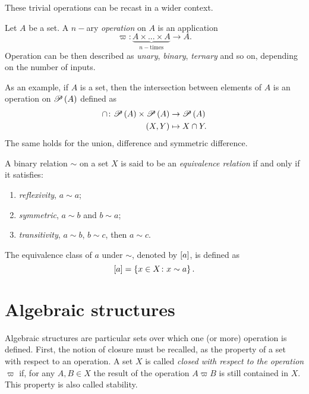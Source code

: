 These trivial operations can be recast in a wider context. 
\begin{definition}[Operation]
    Let $A$ be a set. A $n-$ary \emph{operation} on $A$ is an application
    \begin{equation*}
        \varpi\colon \underbrace{A\times ... \times A}_{n-\text{times}} \rightarrow A.
    \end{equation*}
    Operation can be then described as \textit{unary}, \textit{binary}, \textit{ternary} and so on, depending on the number of inputs.
\end{definition}
As an example, if $A$ is a set, then the intersection between elements of $A$ is an operation on $\mathscr{P}\left( A \right)$ defined as 
\begin{align*}
    \cap\colon\mathscr{P}\left( A \right)\times\mathscr{P}\left( A \right)&\rightarrow\mathscr{P}\left( A \right)\\
    \left( X,Y \right)&\mapsto X\cap Y.
\end{align*}
The same holds for the union, difference and symmetric difference.
\begin{definition}
    A binary relation $\sim$ on a set $X$ is said to be an \emph{equivalence relation} if and only if it satisfies:
    \begin{enumerate}
        \item \emph{reflexivity}, $a \sim a$;
        \item \emph{symmetric}, $a \sim b$ and $b \sim a$;
        \item \emph{transitivity}, $a \sim b$, $b \sim c$, then $a \sim c$. 
    \end{enumerate}
    The equivalence class of $a$ under $\sim$, denoted by $\left[ a \right]$, is defined as
    \begin{equation*}
        \left[ a \right] = \left\lbrace x\in X \colon x\sim a \right\rbrace.
    \end{equation*}
\end{definition}

\section{Algebraic structures }

Algebraic structures are particular sets over which one (or more) operation is defined.
First, the notion of closure must be recalled, as the property of a set with respect to an operation. A set $X$ is called \textit{closed with respect to the operation} $\varpi$ if, for any $A,B\in X$ the result of the operation $A\varpi B$ is still contained in $X$. This property is also called stability.

